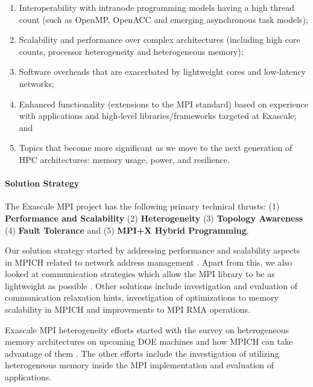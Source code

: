 \begin{enumerate}

\item Interoperability with intranode programming models having a high
  thread count \cite{Hybrid1, Hybrid2, FT2} (such as OpenMP,
  OpenACC and emerging asynchronous task models);

\item Scalability and performance over complex architectures
  \cite{Perf1, Perf2, FT2, Perf4} (including high core counts,
  processor heterogeneity and heterogeneous memory);

\item Software overheads that are exacerbated by lightweight cores and
  low-latency networks;

\item Enhanced functionality (extensions to the MPI standard) based on
  experience with applications and high-level libraries/frameworks
  targeted at Exascale; and

\item Topics that become more significant as we move to the next
  generation of HPC architectures: memory usage, power, and
  resilience.

\end{enumerate}


\paragraph{Solution Strategy}

The Exascale MPI project has the following primary technical thrusts:
(1) \textbf{Performance and Scalability} (2) \textbf{Heterogeneity}
(3) \textbf{Topology Awareness} (4) \textbf{Fault Tolerance} and (5)
\textbf{MPI+X Hybrid Programming}.

Our solution strategy started by addressing performance and
scalability aspects in MPICH related to network address management
\cite{memscal}.  Apart from this, we also looked at communication
strategies which allow the MPI library to be as lightweight as
possible \cite{ch41, ch42}.  Other solutions include
investigation and evaluation of communication relaxation hints,
investigation of optimizations to memory scalability in MPICH and
improvements to MPI RMA operations.

Exascale MPI heterogeneity efforts \cite{Hetero1, Hetero2, Hetero3}
started with the survey on heterogeneous memory architectures on
upcoming DOE machines and how MPICH can take advantage of them
\cite{hexe}.  The other efforts include the investigation of
utilizing heterogeneous memory inside the MPI implementation and
evaluation of applications.

